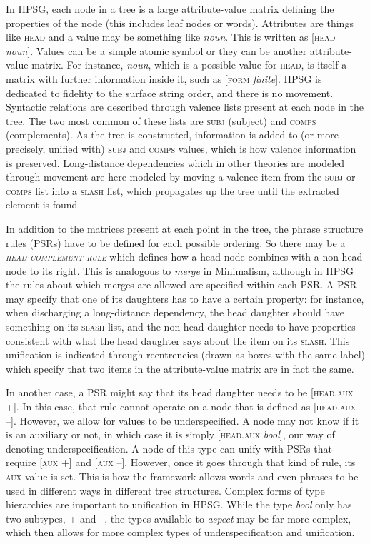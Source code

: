 In HPSG, each node in a tree is a large attribute-value matrix defining the properties of the node (this includes leaf nodes or words). Attributes are things like \textsc{head} and a value may be something like \textit{noun}. This is written as [\textsc{head} \textit{noun}]. Values can be a simple atomic symbol or they can be another attribute-value matrix. For instance, \textit{noun}, which is a possible value for \textsc{head}, is itself a matrix with further information inside it, such as [\textsc{form} \textit{finite}]. HPSG is dedicated to fidelity to the surface string order, and there is no movement. Syntactic relations are described through valence lists present at each node in the tree. The two most common of these lists are \textsc{subj} (subject) and \textsc{comps} (complements). As the tree is constructed, information is added to (or more precisely, unified with) \textsc{subj} and \textsc{comps} values, which is how valence information is preserved. Long-distance dependencies which in other theories are modeled through movement are here modeled by moving a valence item from the \textsc{subj} or \textsc{comps} list into a \textsc{slash} list, which propagates up the tree until the extracted element is found.

In addition to the matrices present at each point in the tree, the phrase structure rules (PSRs) have to be defined for each possible ordering. So there may be a \textsc{\textit{head-complement-rule}} which defines how a head node combines with a non-head node to its right. This is analogous to \textit{merge} in Minimalism, although in HPSG the rules about which merges are allowed are specified within each PSR. A PSR may specify that one of its daughters has to have a certain property: for instance, when discharging a long-distance dependency, the head daughter should have something on its \textsc{slash} list, and the non-head daughter needs to have properties consistent with what the head daughter says about the item on its \textsc{slash}. This unification is indicated through reentrencies (drawn as boxes with the same label) which specify that two items in the attribute-value matrix are in fact the same.

In another case, a PSR might say that its head daughter needs to be [\textsc{head.aux} +]. In this case, that rule cannot operate on a node that is defined as [\textsc{head.aux} --]. However, we allow for values to be underspecified. A node may not know if it is an auxiliary or not, in which case it is simply [\textsc{head.aux} \textit{bool}], our way of denoting underspecification. A node of this type can unify with PSRs that require [\textsc{aux} +] and [\textsc{aux} --]. However, once it goes through that kind of rule, its \textsc{aux} value is set. This is how the framework allows words and even phrases to be used in different ways in different tree structures. Complex forms of type hierarchies are important to unification in HPSG. While the type \textit{bool} only has two subtypes, + and --, the types available to \textit{aspect} may be far more complex, which then allows for more complex types of underspecification and unification.

